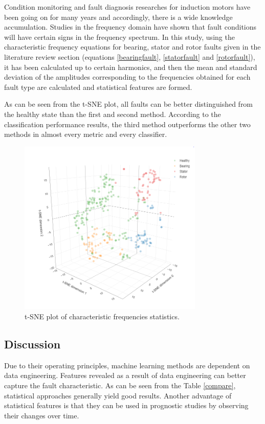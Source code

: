 Condition monitoring and fault diagnosis researches for induction motors have been going on for many years and accordingly, there is a wide knowledge accumulation. Studies in the frequency domain have shown that fault conditions will have certain signs in the frequency spectrum. In this study, using the characteristic frequency equations for bearing, stator and rotor faults given in the literature review section (equations \ref{bearingfault}, \ref{statorfault} and \ref{rotorfault}), it has been calculated up to certain harmonics, and then the mean and standard deviation of the amplitudes corresponding to the frequencies obtained for each fault type are calculated and statistical features are formed.

As can be seen from the t-SNE plot, all faults can be better distinguished from the healthy state than the first and second method. According to the classification performance results, the third method outperforms the other two methods in almost every metric and every classifier.

\begin{figure}[h]
	\centering
	\includegraphics[width=250pt,keepaspectratio=true]{./fig/sne_mcsa.PNG}
	\caption{t-SNE plot of characteristic frequencies statistics.}	
	\label{snem}
\end{figure}






\subsection{Discussion}

Due to their operating principles, machine learning methods are dependent on data engineering. Features revealed as a result of data engineering can better capture the fault characteristic. As can be seen from the Table \ref{compare}, statistical approaches generally yield good results. Another advantage of statistical features is that they can be used in prognostic studies by observing their changes over time. 

